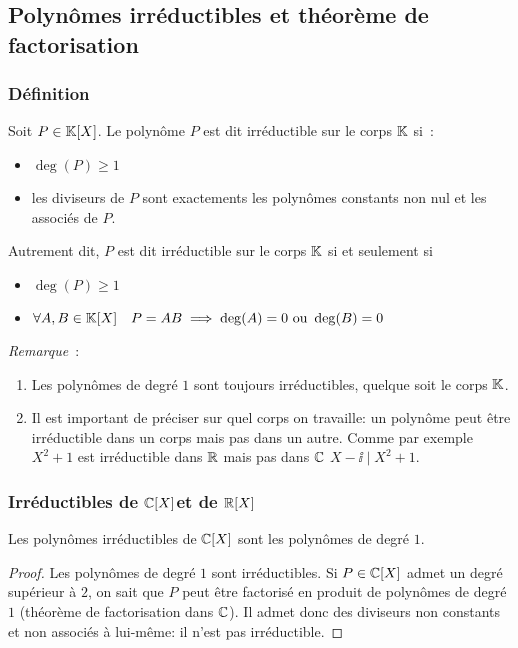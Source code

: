 \subsection{Polynômes irréductibles et théorème de factorisation}

\subsubsection{Définition}

\begin{defdef}
  Soit \(P \in \mathbb{K}[X]\). Le polynôme \(P\) est dit irréductible sur le corps
  \(\mathbb{K}\) si~:
  \begin{itemize}
    \item \(\deg(P) \geqslant 1\)
    \item les diviseurs de \(P\) sont exactements les polynômes constants non
      nul et les associés de \(P\).
  \end{itemize}
  Autrement dit, \(P\) est dit irréductible sur le corps \(\mathbb{K}\) si et seulement
  si
  \begin{itemize}
    \item \(\deg(P) \geqslant 1\)
    \item \(\forall A,B \in \mathbb{K}[X] \quad P = AB \implies \deg(A) = 0 \text{~ou~}
      \deg(B) = 0\)
  \end{itemize}
\end{defdef}

\emph{Remarque}~:
\begin{enumerate}
  \item Les polynômes de degré \(1\) sont toujours irréductibles, quelque soit
    le corps \(\mathbb{K}\).
  \item Il est important de préciser sur quel corps on travaille: un polynôme
    peut être irréductible dans un corps mais pas dans un autre. Comme par
    exemple \(X^2+1\) est irréductible dans \(\mathbb{R}\) mais pas dans \(\mathbb{C}\)
    \(X-\ii\mid{}X^2+1\).
\end{enumerate}

\subsubsection{Irréductibles de \(\mathbb{C}[X]\)et de \(\mathbb{R}[X]\)}

\begin{prop}
  Les polynômes irréductibles de \(\mathbb{C}[X]\) sont les polynômes de degré \(1\).
\end{prop}
\begin{proof}
  Les polynômes de degré \(1\) sont irréductibles. Si \(P\in \mathbb{C}[X]\) admet un
  degré supérieur à \(2\), on sait que \(P\) peut être factorisé en produit de
  polynômes de degré \(1\) (théorème de factorisation dans \(\mathbb{C}\)). Il admet
  donc des diviseurs non constants et non associés à lui-même: il n'est pas
  irréductible.
\end{proof}

